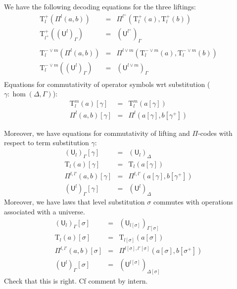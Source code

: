\documentclass[11pt,a4paper]{article}
\theoremstyle{definition}
\newcommand{\UU}{\mathsf{U}}
\def\UU{\mathsf{U}}
\newcommand{\N}{\mathsf{N}}
\def\U{\mathsf{U}}
\newcommand{\Ta}{\mathrm{T}}
\begin{document}
We have the following decoding equations for the three liftings:
\begin{eqnarray*}
\Ta^+_{l}(\Pi^{l}(a,b)) &=& \Pi^{l^+}(\Ta^+_l(a),\Ta^+_l(b))\\
\Ta^+_{l^+}((\UU^l)_\Gamma) &=& (\UU^{l^+})_\Gamma\\
&&\\
\Ta^{-\vee m}_{l}(\Pi^{l}(a,b)) &=& \Pi^{l \vee m}(\Ta^{-\vee m}_l(a),\Ta^{-\vee m}_l(b))\\
\Ta^{-\vee m}_{l}((\UU^l)_\Gamma) &=& (\UU^{l\vee m})_\Gamma\\
&&
\end{eqnarray*}
Equations for commutativity of operator symbols wrt substitution ($\gamma : \hom(\Delta,\Gamma)$):
\begin{eqnarray*}
\Ta^m_l(a) [ \gamma ] &=& \Ta^m_l(a[ \gamma ] )\\
\Pi^{l}(a,b)[ \gamma ] &=& \Pi^{l}(a [ \gamma ], b[ \gamma^+ ])
\end{eqnarray*}


Moreover, we have equations for commutativity of lifting and $\Pi$-codes with respect to term substitution $\gamma$:
 \begin{eqnarray*}
(\U_l)_\Gamma [ \gamma ] &=& (\U_l)_\Delta\\
\Ta_l(a) [ \gamma ] &=& \Ta_l(a[ \gamma ] )\\
\Pi^{l,l'}(a,b)[ \gamma ] &=& \Pi^{l,l'}(a [ \gamma ], b[ \gamma^+ ])\\
(\UU^l)_\Gamma[ \gamma ] &=&(\UU^l)_\Delta
\end{eqnarray*}
Moreover, we have laws that level substitution $\sigma$ commutes with operations associated with a universe.
 \begin{eqnarray*}
 (\U_{l})_\Gamma[\sigma] &=& (\U_{l[\sigma]})_{\Gamma[\sigma]}\\
 \Ta_l(a) [ \sigma ] &=& \Ta_{l[\sigma]}(a[ \sigma ] )\\
\Pi^{l,l'}(a,b)[ \sigma ] &=& \Pi^{l[ \sigma ] ,l'[ \sigma ] }(a [ \sigma ], b[ \sigma^+ ])\\
(\UU^l)_\Gamma[ \sigma ] &=&(\UU^{l[ \sigma ]} )_{\Delta[ \sigma ]} 
 \end{eqnarray*}
Check that this is right. Cf comment by intern.
\end{document}
